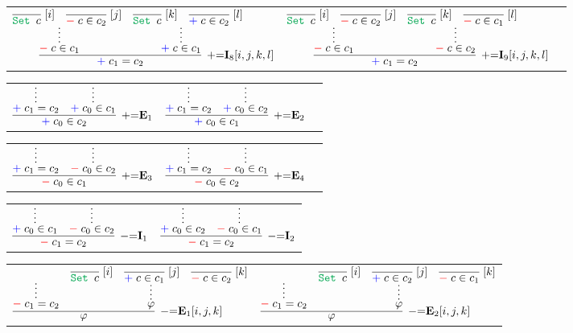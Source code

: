 \documentclass[11pt]{article}
\begin{document}
\bigskip
\noindent
\begin{tabular}{ccc}
$
\infer[\AssertRule{=}\Intro{8}{[i,j,k,l]}]{\Assert{c_1= c_2}}{
	\infer*{\Deny{c\in c_1}}{
		\infer[\Label{i}]{\Set{c}}{} 
		& 
		\infer[\Label{j}]{\Deny{c\in c_2}}{}
	}
    &
	\infer*{\Assert{c\in c_1}}{
		\infer[\Label{k}]{\Set{c}}{} 
		& 
		\infer[\Label{l}]{\Assert{c\in c_2}}{}
	}
}
$
&
$
\infer[\AssertRule{=}\Intro{9}{[i,j,k,l]}]{\Assert{c_1= c_2}}{
	\infer*{\Deny{c\in c_1}}{
		\infer[\Label{i}]{\Set{c}}{} 
		& 
		\infer[\Label{j}]{\Deny{c\in c_2}}{}
	}
    &
	\infer*{\Deny{c\in c_2}}{
		\infer[\Label{k}]{\Set{c}}{} 
		& 
		\infer[\Label{l}]{\Deny{c\in c_1}}{}
	}
}
$
\end{tabular}
\bigskip

\noindent
\begin{tabular}{ccc}
$
\infer[\AssertRule{=}\Elim{1}]{\Assert{c_0\in c_2}}{
	\infer*{\Assert{c_1= c_2}}{} 
	& 
	\infer*{\Assert{c_0\in c_1}}{}
}
$
\hspace{1cm}
&
$
\infer[\AssertRule{=}\Elim{2}]{\Assert{c_0\in c_1}}{
	\infer*{\Assert{c_1= c_2}}{} 
	& 
	\infer*{\Assert{c_0\in c_2}}{}
}
$
\end{tabular}
\bigskip

\noindent
\begin{tabular}{ccc}
$
\infer[\AssertRule{=}\Elim{3}]{\Deny{c_0\in c_1}}{
	\infer*{\Assert{c_1= c_2}}{} 
	& 
	\infer*{\Deny{c_0\in c_2}}{}
}
$
\hspace{1cm}
&
$
\infer[\AssertRule{=}\Elim{4}]{\Deny{c_0\in c_2}}{
	\infer*{\Assert{c_1= c_2}}{} 
	& 
	\infer*{\Deny{c_0\in c_1}}{}
}
$
\end{tabular}
\bigskip

\noindent
\begin{tabular}{cc}
$
\infer[\DenyRule{=}\Intro{1}]{\Deny{c_1= c_2}}{
	\infer*{\Assert{c_0\in c_1}}{}
	&
	\infer*{\Deny{c_0\in c_2}}{}
}
$
\hspace{1cm}
&
$
\infer[\DenyRule{=}\Intro{2}]{\Deny{c_1= c_2}}{
	\infer*{\Assert{c_0\in c_2}}{}
	&
	\infer*{\Deny{c_0\in c_1}}{}
}
$
\end{tabular}
\bigskip

\noindent
\begin{tabular}{cc}
$
\infer[\DenyRule{=}\Elim{1}{[i,j,k]}]{\varphi}{
	\infer*{\Deny{c_1= c_2}}{}
	&
	\infer*{\varphi}{
		\infer[\Label{i}]{\Set{c}}{}
		&
		\infer[\Label{j}]{\Assert{c\in c_1}}{}
		&
		\infer[\Label{k}]{\Deny{c\in c_2}}{}
	}
}
$
\hspace{0.5cm}
&
$
\infer[\DenyRule{=}\Elim{2}{[i,j,k]}]{\varphi}{
	\infer*{\Deny{c_1= c_2}}{}
	&
	\infer*{\varphi}{
		\infer[\Label{i}]{\Set{c}}{}
		&
		\infer[\Label{j}]{\Assert{c\in c_2}}{}
		&
		\infer[\Label{k}]{\Deny{c\in c_1}}{}
	}
}
$
\end{tabular}
\end{document}
